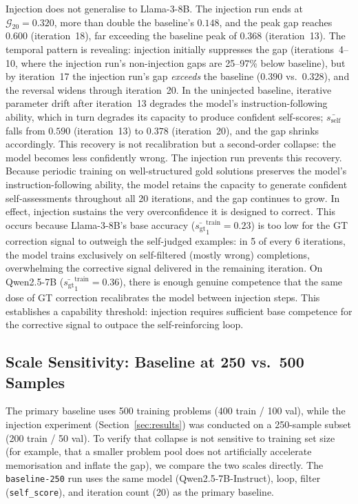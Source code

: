 \documentclass{article}
\newcommand{\gap}{\mathcal{G}}          %
\newcommand{\self}{s_{\text{self}}}     %
\newcommand{\gt}{s_{\text{gt}}}         %
\begin{document}
Injection does not generalise to Llama-3-8B.
The injection run ends at $\gap_{20} = 0.320$, more than double the baseline's
$0.148$, and the peak gap reaches $0.600$ (iteration~18), far exceeding the
baseline peak of $0.368$ (iteration~13).
The temporal pattern is revealing: injection initially suppresses the gap
(iterations~4--10, where the injection run's non-injection gaps are 25--97\%
below baseline), but by iteration~17 the injection run's gap \emph{exceeds}
the baseline ($0.390$ vs.\ $0.328$), and the reversal widens through
iteration~20.
In the uninjected baseline, iterative parameter drift after iteration~13 degrades the
model's instruction-following ability, which in turn degrades its capacity to
produce confident self-scores; $\bar{\self}$ falls from $0.590$ (iteration~13)
to $0.378$ (iteration~20), and the gap shrinks accordingly.
This recovery is not recalibration but a second-order collapse: the model
becomes less confidently wrong.
The injection run prevents this recovery.
Because periodic training on well-structured gold solutions preserves the
model's instruction-following ability, the model retains the capacity to
generate confident self-assessments throughout all 20 iterations, and the gap
continues to grow.
In effect, injection sustains the very overconfidence it is designed to correct.
This occurs because Llama-3-8B's base accuracy ($\bar{\gt}^\text{train}_1 = 0.23$)
is too low for the GT correction signal to outweigh the self-judged examples:
in 5 of every 6 iterations, the model trains exclusively on self-filtered
(mostly wrong) completions, overwhelming the corrective signal delivered in the
remaining iteration.
On Qwen2.5-7B ($\bar{\gt}^\text{train}_1 = 0.36$), there is enough genuine
competence that the same dose of GT correction recalibrates the model between
injection steps.
This establishes a capability threshold: injection requires sufficient base
competence for the corrective signal to outpace the self-reinforcing loop.

\subsection{Scale Sensitivity: Baseline at 250 vs.\ 500 Samples}
\label{sec:baseline-250}

The primary baseline uses 500 training problems (400 train / 100 val),
while the injection experiment (Section~\ref{sec:results}) was conducted
on a 250-sample subset (200 train / 50 val).
To verify that collapse is not sensitive to training set size (for example,
that a smaller problem pool does not artificially accelerate memorisation
and inflate the gap), we compare the two scales directly.
The \texttt{baseline-250} run uses the same model (Qwen2.5-7B-Instruct), loop, filter
(\texttt{self\_score}), and iteration count (20) as the primary baseline.
\end{document}
